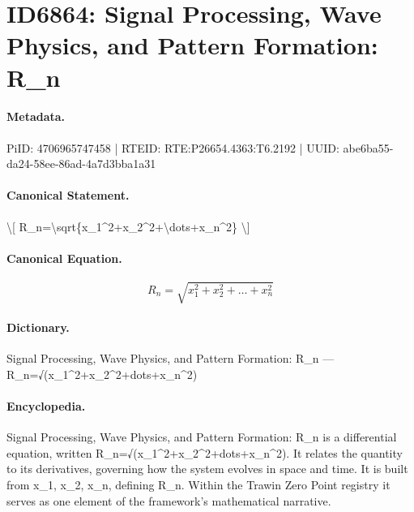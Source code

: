 \section*{ID6864: Signal Processing, Wave Physics, and Pattern Formation: R\_n}
\paragraph{Metadata.}
PiID: 4706965747458 | RTEID: RTE:P26654.4363:T6.2192 | UUID: abe6ba55-da24-58ee-86ad-4a7d3bba1a31

\paragraph{Canonical Statement.}
\textbackslash{}[ R\_n=\textbackslash{}sqrt\{x\_1\textasciicircum{}2+x\_2\textasciicircum{}2+\textbackslash{}dots+x\_n\textasciicircum{}2\} \textbackslash{}]

\paragraph{Canonical Equation.}
\[
R_n=\sqrt{x_1^2+x_2^2+\dots+x_n^2}
\]

\paragraph{Dictionary.}
Signal Processing, Wave Physics, and Pattern Formation: R\_n — R\_n=√(x\_1\textasciicircum{}2+x\_2\textasciicircum{}2+dots+x\_n\textasciicircum{}2)

\paragraph{Encyclopedia.}
Signal Processing, Wave Physics, and Pattern Formation: R\_n is a differential equation, written R\_n=√(x\_1\textasciicircum{}2+x\_2\textasciicircum{}2+dots+x\_n\textasciicircum{}2). It relates the quantity to its derivatives, governing how the system evolves in space and time. It is built from x\_1, x\_2, x\_n, defining R\_n. Within the Trawin Zero Point registry it serves as one element of the framework's mathematical narrative.
